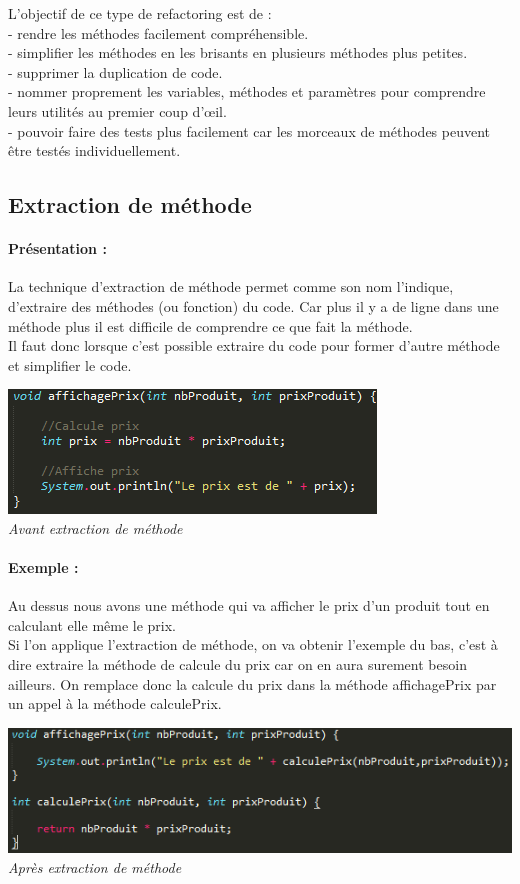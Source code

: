 \documentclass[a4paper,twoside,12pt,openright]{report}
\begin{document}
L'objectif de ce type de refactoring est de :\\
- rendre les méthodes facilement compréhensible.\\
- simplifier les méthodes en les brisants en plusieurs méthodes plus petites.\\
- supprimer la duplication de code.\\
- nommer proprement les variables, méthodes et paramètres pour comprendre leurs utilités au premier coup d'œil.\\
- pouvoir faire des tests plus facilement car les morceaux de méthodes peuvent être testés individuellement.\cite{ref6}

\newpage

\subsection{Extraction de méthode}
\paragraph{Présentation :} 
La technique d'extraction de méthode permet comme son nom l'indique, d'extraire des méthodes (ou fonction) du code. Car plus il y a de ligne dans une méthode plus il est difficile de comprendre ce que fait la méthode.\\
Il faut donc lorsque c'est possible extraire du code pour former d'autre méthode et simplifier le code.
\begin{center}
\includegraphics[scale=1]{Image/Extraction_Methode.png}\\
\itshape{Avant extraction de méthode}
\end{center}

\paragraph{Exemple :} 
Au dessus nous avons une méthode qui va afficher le prix d'un produit tout en calculant elle même le prix.\\
Si l'on applique l'extraction de méthode, on va obtenir l'exemple du bas, c'est à dire extraire la méthode de calcule du prix car on en aura surement besoin ailleurs. On remplace donc la calcule du prix dans la méthode affichagePrix par un appel à la méthode calculePrix.\\
\begin{center}
\includegraphics[scale=1]{Image/Extraction_Methode2.png}\\
\itshape{Après extraction de méthode}
\end{center}
\end{document}
